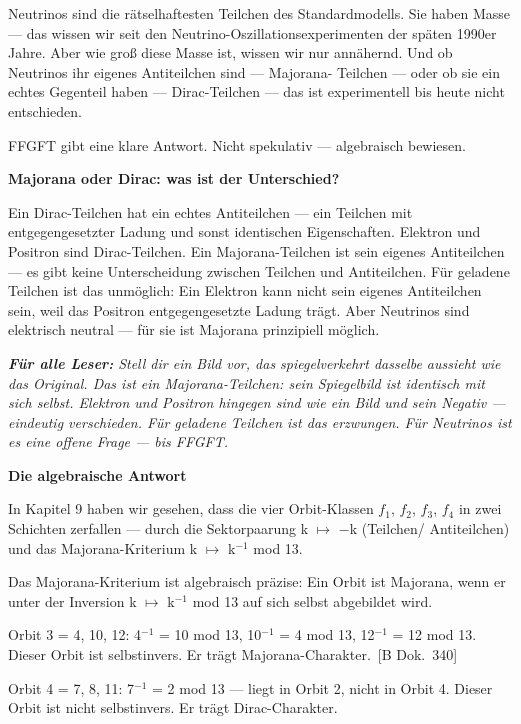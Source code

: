 \documentclass[11pt,oneside]{book}
\newcommand{\status}[1]{\penalty10000\,{\scriptsize\textcolor{gray!60}{[#1]}}}
\newenvironment{laierspur}{%
  \par\vspace{4pt}%
  \noindent\small\itshape\color{blue!60!black}%
  \textbf{Für alle Leser:}\enspace\ignorespaces}{%
  \par\vspace{4pt}\normalsize\normalfont\normalcolor}
\begin{document}
Neutrinos sind die rätselhaftesten Teilchen des Standardmodells. Sie haben
Masse — das wissen wir seit den Neutrino-Oszillationsexperimenten der
späten 1990er Jahre. Aber wie groß diese Masse ist, wissen wir nur
annähernd. Und ob Neutrinos ihr eigenes Antiteilchen sind — Majorana-
Teilchen — oder ob sie ein echtes Gegenteil haben — Dirac-Teilchen —
das ist experimentell bis heute nicht entschieden.


FFGFT gibt eine klare Antwort. Nicht spekulativ — algebraisch bewiesen.


\textbf{Majorana oder Dirac: was ist der Unterschied?}


Ein Dirac-Teilchen hat ein echtes Antiteilchen — ein Teilchen mit
entgegengesetzter Ladung und sonst identischen Eigenschaften. Elektron
und Positron sind Dirac-Teilchen. Ein Majorana-Teilchen ist sein eigenes
Antiteilchen — es gibt keine Unterscheidung zwischen Teilchen und
Antiteilchen. Für geladene Teilchen ist das unmöglich: Ein Elektron kann
nicht sein eigenes Antiteilchen sein, weil das Positron entgegengesetzte
Ladung trägt. Aber Neutrinos sind elektrisch neutral — für sie ist
Majorana prinzipiell möglich.


\begin{laierspur}
Stell dir ein Bild vor, das spiegelverkehrt dasselbe
aussieht wie das Original. Das ist ein Majorana-Teilchen: sein
Spiegelbild ist identisch mit sich selbst. Elektron und Positron
hingegen sind wie ein Bild und sein Negativ — eindeutig verschieden.
Für geladene Teilchen ist das erzwungen. Für Neutrinos ist es eine
offene Frage — bis FFGFT.
\end{laierspur}

\textbf{Die algebraische Antwort}


In Kapitel 9 haben wir gesehen, dass die vier Orbit-Klassen {$f_1$, $f_2$, $f_3$, $f_4$}
in zwei Schichten zerfallen — durch die Sektorpaarung k $\mapsto$ $-$k (Teilchen/
Antiteilchen) und das Majorana-Kriterium k $\mapsto$ k$^{-1}$ mod 13.


Das Majorana-Kriterium ist algebraisch präzise: Ein Orbit ist Majorana,
wenn er unter der Inversion k $\mapsto$ k$^{-1}$ mod 13 auf sich selbst abgebildet wird.


Orbit 3 = {4, 10, 12}: 4$^{-1}$ = 10 mod 13, 10$^{-1}$ = 4 mod 13, 12$^{-1}$ = 12 mod 13.
Dieser Orbit ist selbstinvers. Er trägt Majorana-Charakter. \status{B Dok.~340}


Orbit 4 = {7, 8, 11}: 7$^{-1}$ = 2 mod 13 — liegt in Orbit 2, nicht in Orbit 4.
Dieser Orbit ist nicht selbstinvers. Er trägt Dirac-Charakter.
\end{document}
